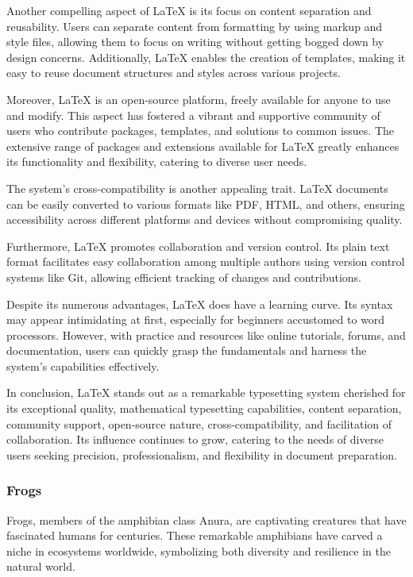 \documentclass[twocolumn, 9pt]{extarticle}
\begin{document}
Another compelling aspect of LaTeX is its focus on content separation and reusability. Users can separate content from formatting by using markup and style files, allowing them to focus on writing without getting bogged down by design concerns. Additionally, LaTeX enables the creation of templates, making it easy to reuse document structures and styles across various projects.

Moreover, LaTeX is an open-source platform, freely available for anyone to use and modify. This aspect has fostered a vibrant and supportive community of users who contribute packages, templates, and solutions to common issues. The extensive range of packages and extensions available for LaTeX greatly enhances its functionality and flexibility, catering to diverse user needs.

The system's cross-compatibility is another appealing trait. LaTeX documents can be easily converted to various formats like PDF, HTML, and others, ensuring accessibility across different platforms and devices without compromising quality.

Furthermore, LaTeX promotes collaboration and version control. Its plain text format facilitates easy collaboration among multiple authors using version control systems like Git, allowing efficient tracking of changes and contributions.

Despite its numerous advantages, LaTeX does have a learning curve. Its syntax may appear intimidating at first, especially for beginners accustomed to word processors. However, with practice and resources like online tutorials, forums, and documentation, users can quickly grasp the fundamentals and harness the system's capabilities effectively.

In conclusion, LaTeX stands out as a remarkable typesetting system cherished for its exceptional quality, mathematical typesetting capabilities, content separation, community support, open-source nature, cross-compatibility, and facilitation of collaboration. Its influence continues to grow, catering to the needs of diverse users seeking precision, professionalism, and flexibility in document preparation.


\subsubsection{Frogs}

Frogs, members of the amphibian class Anura, are captivating creatures that have fascinated humans for centuries. These remarkable amphibians have carved a niche in ecosystems worldwide, symbolizing both diversity and resilience in the natural world.
\end{document}
